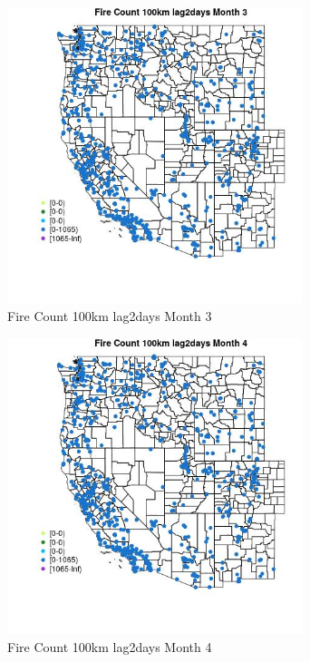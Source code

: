 \begin{figure} 
\centering  
\includegraphics[width=0.77\textwidth]{Code_Outputs/Report_ML_input_PM25_Step4_part_f_de_duplicated_aves_prioritize_24hr_obswNAs_MapObsMo3Fire_Count_100km_lag2days.jpg} 
\caption{\label{fig:Report_ML_input_PM25_Step4_part_f_de_duplicated_aves_prioritize_24hr_obswNAsMapObsMo3Fire_Count_100km_lag2days}Fire Count 100km lag2days Month 3} 
\end{figure} 
 

\begin{figure} 
\centering  
\includegraphics[width=0.77\textwidth]{Code_Outputs/Report_ML_input_PM25_Step4_part_f_de_duplicated_aves_prioritize_24hr_obswNAs_MapObsMo4Fire_Count_100km_lag2days.jpg} 
\caption{\label{fig:Report_ML_input_PM25_Step4_part_f_de_duplicated_aves_prioritize_24hr_obswNAsMapObsMo4Fire_Count_100km_lag2days}Fire Count 100km lag2days Month 4} 
\end{figure} 
 

